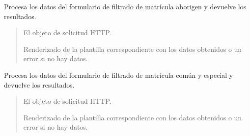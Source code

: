 \documentclass[letterpaper,10pt,spanish]{sphinxmanual}
\begin{document}
\begin{fulllineitems}

\pysigstartsignatures
{}
\pysigstopsignatures
\sphinxAtStartPar
Procesa los datos del formulario de filtrado de matrícula aborigen y devuelve los resultados.
\begin{quote}\begin{description}
\sphinxAtStartPar
{} \textendash{} El objeto de solicitud HTTP.

\sphinxAtStartPar
Renderizado de la plantilla correspondiente con los datos obtenidos o un error si no hay datos.

\end{description}\end{quote}

\end{fulllineitems}



\begin{fulllineitems}

\pysigstartsignatures
{}
\pysigstopsignatures
\sphinxAtStartPar
Procesa los datos del formulario de filtrado de matrícula común y especial y devuelve los resultados.
\begin{quote}\begin{description}
\sphinxAtStartPar
{} \textendash{} El objeto de solicitud HTTP.

\sphinxAtStartPar
Renderizado de la plantilla correspondiente con los datos obtenidos o un error si no hay datos.

\end{description}\end{quote}

\end{fulllineitems}
\end{document}
